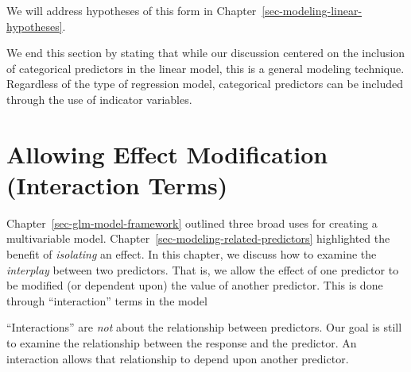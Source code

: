 \documentclass[
  letterpaper,
  DIV=11,
  numbers=noendperiod]{scrreprt}
\theoremstyle{definition}
\theoremstyle{definition}
\theoremstyle{remark}
\begin{document}
We will address hypotheses of this form in
Chapter~\ref{sec-modeling-linear-hypotheses}.

We end this section by stating that while our discussion centered on the
inclusion of categorical predictors in the linear model, this is a
general modeling technique. Regardless of the type of regression model,
categorical predictors can be included through the use of indicator
variables.

\hypertarget{sec-modeling-interactions}{%
\chapter{Allowing Effect Modification (Interaction
Terms)}\label{sec-modeling-interactions}}

\providecommand{\norm}[1]{\left\lVert#1\right\rVert}
\providecommand{\abs}[1]{\left\lvert#1\right\rvert}
\providecommand{\dist}[1]{\stackrel{\text{#1}}{\sim}}
\providecommand{\ind}[1]{\mathbb{I}\left(#1\right)}
\providecommand{\bm}[1]{\mathbf{#1}}
\providecommand{\bs}[1]{\boldsymbol{#1}}
\providecommand{\Ell}{\mathcal{L}}
\providecommand{\indep}{\perp\negthickspace\negmedspace\perp}

Chapter~\ref{sec-glm-model-framework} outlined three broad uses for
creating a multivariable model.
Chapter~\ref{sec-modeling-related-predictors} highlighted the benefit of
\emph{isolating} an effect. In this chapter, we discuss how to examine
the \emph{interplay} between two predictors. That is, we allow the
effect of one predictor to be modified (or dependent upon) the value of
another predictor. This is done through ``interaction'' terms in the
model

\begin{tcolorbox}[enhanced jigsaw, left=2mm, toprule=.15mm, arc=.35mm, breakable, opacitybacktitle=0.6, opacityback=0, rightrule=.15mm, colbacktitle=quarto-callout-warning-color!10!white, coltitle=black, leftrule=.75mm, toptitle=1mm, colframe=quarto-callout-warning-color-frame, titlerule=0mm, title=\textcolor{quarto-callout-warning-color}{\faExclamationTriangle}\hspace{0.5em}{Warning}, bottomrule=.15mm, colback=white, bottomtitle=1mm]

``Interactions'' are \emph{not} about the relationship between
predictors. Our goal is still to examine the relationship between the
response and the predictor. An interaction allows that relationship to
depend upon another predictor.

\end{tcolorbox}
\end{document}
